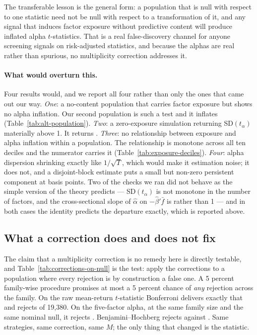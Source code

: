 \documentclass{article}
\begin{document}
The transferable lesson is the general form: a population that is null with
respect to one statistic need not be null with respect to a transformation of
it, and any signal that induces factor exposure without predictive content will
produce inflated alpha $t$-statistics. That is a real false-discovery channel
for anyone screening signals on risk-adjusted statistics, and because the
alphas are real rather than spurious, no multiplicity correction addresses it.

\paragraph{What would overturn this.} Four results would, and we report all
four rather than only the ones that came out our way. \emph{One}: a no-content
population that carries factor exposure but shows no alpha inflation. Our
second population is such a test and it inflates
(Table~\ref{tab:alt-population}). \emph{Two}: a zero-exposure simulation
returning SD$(t_\alpha)$ materially above 1. It returns \bzooamPlaceboIid{}.
\emph{Three}: no relationship between exposure and alpha inflation within a
population. The relationship is monotone across all ten deciles and the
numerator carries it (Table~\ref{tab:exposure-deciles}). \emph{Four}: alpha
dispersion shrinking exactly like $1/\sqrt{T}$, which would make it estimation
noise; it does not, and a disjoint-block estimate puts a small but non-zero
persistent component at \bzooamPersistentBps{} basis points. Two of the checks we ran did not
behave as the simple version of the theory predicts --- SD$(t_\alpha)$ is not
monotone in the number of factors, and the cross-sectional slope of
$\hat\alpha$ on $-\hat\beta'\bar f$ is \bzooamSlopeVw{} rather than 1 --- and
in both cases the identity predicts the departure exactly, which is reported
above.

\subsection{What a correction does and does not fix}
\label{sec:corrections}



The claim that a multiplicity correction is no remedy here is directly
testable, and Table~\ref{tab:corrections-on-null} is the test: apply the
corrections to a population where every rejection is by construction a false
one. A 5 percent family-wise procedure promises at most a 5 percent chance of
\emph{any} rejection across the family. On the raw mean-return $t$-statistic
Bonferroni delivers exactly that and rejects \bzooamBonfFalseMean{} of
19{,}380. On the five-factor alpha, at the same family size and the same
nominal null, it rejects \bzooamBonfFalseAlpha{}. Benjamini--Hochberg rejects
\bzooamBhFalseAlpha{} against \bzooamBhFalseMean{}. Same strategies, same
correction, same $M$; the only thing that changed is the statistic.
\end{document}
